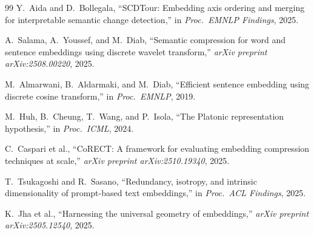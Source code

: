 \documentclass[sigconf]{acmart}
\begin{document}
\begin{thebibliography}{99}
Y.~Aida and D.~Bollegala, ``SCDTour: Embedding axis ordering and merging for interpretable semantic change detection,'' in \emph{Proc.\ EMNLP Findings}, 2025.

A.~Salama, A.~Youssef, and M.~Diab, ``Semantic compression for word and sentence embeddings using discrete wavelet transform,'' \emph{arXiv preprint arXiv:2508.00220}, 2025.

M.~Almarwani, B.~Aldarmaki, and M.~Diab, ``Efficient sentence embedding using discrete cosine transform,'' in \emph{Proc.\ EMNLP}, 2019.

M.~Huh, B.~Cheung, T.~Wang, and P.~Isola, ``The Platonic representation hypothesis,'' in \emph{Proc.\ ICML}, 2024.

C.~Caspari et al., ``CoRECT: A framework for evaluating embedding compression techniques at scale,'' \emph{arXiv preprint arXiv:2510.19340}, 2025.

T.~Tsukagoshi and R.~Sasano, ``Redundancy, isotropy, and intrinsic dimensionality of prompt-based text embeddings,'' in \emph{Proc.\ ACL Findings}, 2025.

K.~Jha et al., ``Harnessing the universal geometry of embeddings,'' \emph{arXiv preprint arXiv:2505.12540}, 2025.

\end{thebibliography}
\end{document}
